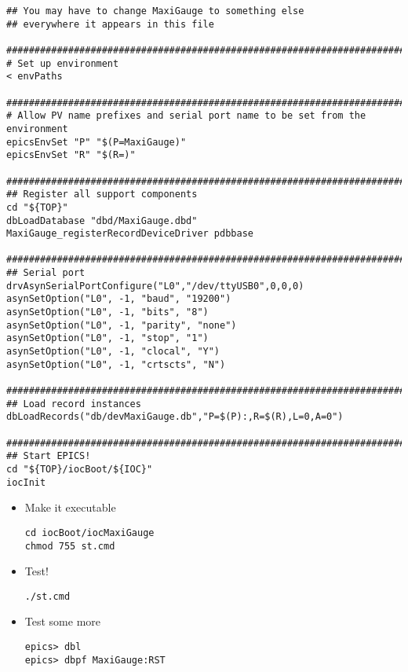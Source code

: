 \documentclass[11pt]{article}
\begin{document}
\begin{enumerate}
\begin{verbatim}
## You may have to change MaxiGauge to something else
## everywhere it appears in this file

############################################################################### 
# Set up environment 
< envPaths

############################################################################### 
# Allow PV name prefixes and serial port name to be set from the environment 
epicsEnvSet "P" "$(P=MaxiGauge)" 
epicsEnvSet "R" "$(R=)" 

############################################################################### 
## Register all support components
cd "${TOP}"
dbLoadDatabase "dbd/MaxiGauge.dbd"
MaxiGauge_registerRecordDeviceDriver pdbbase

###############################################################################
## Serial port
drvAsynSerialPortConfigure("L0","/dev/ttyUSB0",0,0,0) 
asynSetOption("L0", -1, "baud", "19200") 
asynSetOption("L0", -1, "bits", "8") 
asynSetOption("L0", -1, "parity", "none") 
asynSetOption("L0", -1, "stop", "1") 
asynSetOption("L0", -1, "clocal", "Y") 
asynSetOption("L0", -1, "crtscts", "N")

###############################################################################
## Load record instances
dbLoadRecords("db/devMaxiGauge.db","P=$(P):,R=$(R),L=0,A=0")

###############################################################################
## Start EPICS!
cd "${TOP}/iocBoot/${IOC}"
iocInit
\end{verbatim}
\begin{itemize}
\item Make it executable
\begin{verbatim}
cd iocBoot/iocMaxiGauge
chmod 755 st.cmd
\end{verbatim}
\item Test!
\begin{verbatim}
./st.cmd
\end{verbatim}
\item Test some more
\begin{verbatim}
epics> dbl
epics> dbpf MaxiGauge:RST
\end{verbatim}
\end{itemize}
\end{enumerate}
\end{document}
